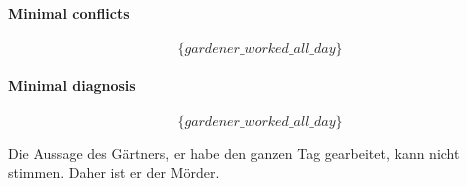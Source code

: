 \documentclass[DIV=9,numbers=noenddot]{scrartcl}
\begin{document}
	\paragraph{Minimal conflicts}
	\[\{gardener\_worked\_all\_day\}\]
	\paragraph{Minimal diagnosis}
	\[\{gardener\_worked\_all\_day\}\]

Die Aussage des Gärtners, er habe den ganzen Tag gearbeitet, kann nicht stimmen. Daher ist er der Mörder.
	
\end{document}
